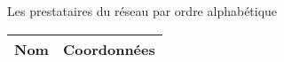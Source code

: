 \documentclass{article}
\newcommand{\nameWidth}{13cm}
\newcommand{\dataWidth}{6cm}
\begin{document}

\pagebreak

  \begin{center}


\pagebreak

    {\Large Les prestataires du réseau par ordre alphabétique}
    \begin{longtable}{|m{\nameWidth} | m{\dataWidth}|}
      \hline
      Nom & Coordonnées  \\ 
      \hline 
      \endhead

      
    \end{longtable}
  \end{center}
\end{document}
